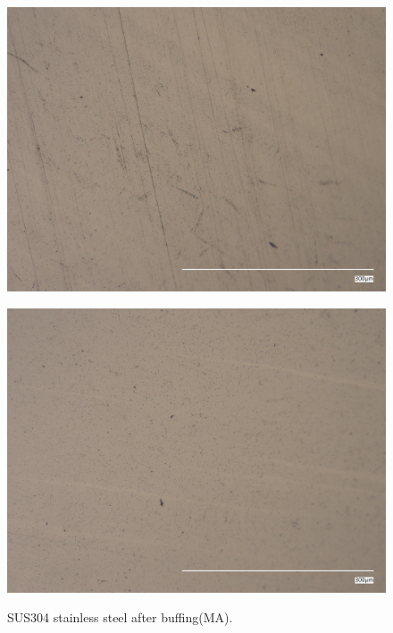 \begin{figure}[htbp]
    \begin{minipage}[htbp]{0.45\linewidth}
      \centering
      \includegraphics[keepaspectratio, scale=0.07]{fig/241218_304MA_3um.jpg}
      \label{fig:MA3um}
    \end{minipage}
    \begin{minipage}[htbp]{0.45\linewidth}
      \centering
      \includegraphics[keepaspectratio, scale=0.07]{fig/241218_304MA_1um.jpg}
      \label{fig:MA1um}
    \end{minipage}
    \centering
    \caption{SUS304 stainless steel after buffing(MA).}
    \label{fig:304MABuff}
\end{figure}
